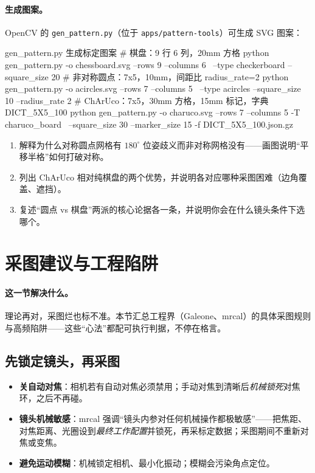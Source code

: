 \paragraph{生成图案。}
OpenCV 的 \texttt{gen\_pattern.py}（位于 \texttt{apps/pattern-tools}）可生成 SVG 图案\cite{opencv2024pattern}：

\begin{codebox}[bash]{gen\_pattern.py 生成标定图案}
# 棋盘：9 行 6 列，20mm 方格
python gen_pattern.py -o chessboard.svg --rows 9 --columns 6 \
       --type checkerboard --square_size 20
# 非对称圆点：7x5，10mm，间距比 radius_rate=2
python gen_pattern.py -o acircles.svg --rows 7 --columns 5 \
       --type acircles --square_size 10 --radius_rate 2
# ChArUco：7x5，30mm 方格，15mm 标记，字典 DICT_5X5_100
python gen_pattern.py -o charuco.svg --rows 7 --columns 5 -T charuco_board \
       --square_size 30 --marker_size 15 -f DICT_5X5_100.json.gz
\end{codebox}

\begin{practice}[练习]
\begin{enumerate}
  \item 解释为什么对称圆点网格有 $180^\circ$ 位姿歧义而非对称网格没有——画图说明“平移半格”如何打破对称。
  \item 列出 ChArUco 相对纯棋盘的两个优势，并说明各对应哪种采图困难（边角覆盖、遮挡）。
  \item 复述“圆点 vs 棋盘”两派的核心论据各一条，并说明你会在什么镜头条件下选哪个。
\end{enumerate}
\end{practice}

\section{采图建议与工程陷阱}
\label{sec:calib-capture}

\paragraph{这一节解决什么。}
理论再对，采图烂也标不准。本节汇总工程界（Galeone\cite{galeone2018guidelines}、mrcal\cite{kogan2024mrcal}）的具体采图规则与高频陷阱——这些“心法”都配可执行判据，不停在格言。

\subsection{先锁定镜头，再采图}
\begin{itemize}
  \item \textbf{关自动对焦}：相机若有自动对焦必须禁用\cite{galeone2018guidelines}；手动对焦到清晰后\emph{机械锁死}对焦环，之后不再碰。
  \item \textbf{镜头机械敏感}：mrcal\cite{kogan2024mrcal} 强调“镜头内参对任何机械操作都极敏感”——把焦距、对焦距离、光圈设到\emph{最终工作配置}并锁死，再采标定数据；采图期间不重新对焦或变焦。
  \item \textbf{避免运动模糊}：机械锁定相机、最小化振动；模糊会污染角点定位。
\end{itemize}


